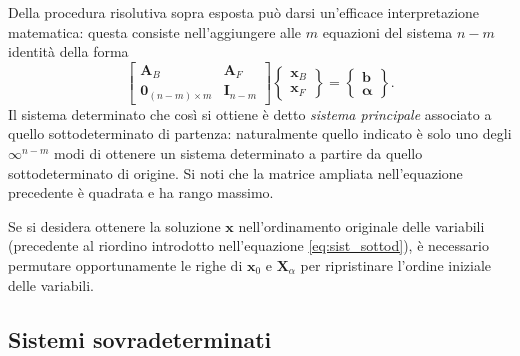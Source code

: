 \begin{oss}
	Della procedura risolutiva sopra esposta può darsi un'efficace interpretazione matematica: questa consiste nell'aggiungere alle $m$ equazioni del sistema $n-m$ identità della forma
	\begin{equation}\label{sist_ind4}
		\left[ \begin{array}{c|c}
			\bm{A}_B & \bm{A}_F \\
			\hline
			\bm{0}_{(n-m)\times m} & \bm{I}_{n-m}
		\end{array} \right]
		\left\{ \begin{array}{c}
			\bm{x}_{B} \\
			\hline
			\bm{x}_{F}
		\end{array} \right\}
		=
		\left\{ \begin{array}{c}
			\bm{b} \\
			\hline
			\bm{\alpha}
		\end{array} \right\}.
	\end{equation}
	Il sistema determinato che così si ottiene è detto \textit{sistema principale} associato a quello sottodeterminato di partenza: naturalmente quello indicato è solo uno degli $\infty^{n-m}$ modi di ottenere un sistema determinato a partire da quello sottodeterminato di origine. Si noti che la matrice ampliata nell'equazione precedente è quadrata e ha rango massimo.
\end{oss}

\begin{oss}\label{sol_in_base_outbase}
	Se si desidera ottenere la soluzione $\bm{x}$ nell'ordinamento originale delle variabili (precedente al riordino introdotto nell'equazione \eqref{eq:sist_sottod}), è necessario permutare opportunamente le righe di $\bm{x}_0$ e $\bm{X}_{\alpha}$ per ripristinare l'ordine iniziale delle variabili.
\end{oss}



\subsection{Sistemi sovradeterminati}\label{par:sovradeterminati}

